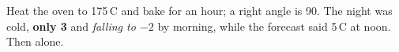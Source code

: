 \documentclass{article}
\begin{document}
Heat the oven to 175\,\textdegree C and bake for an hour; a right angle is 90\textdegree.
The night was cold, \textbf{only 3\textdegree} and \textit{falling to $-2$\textdegree} by morning,
while {\small the forecast said 5\,\textdegree C} at noon. Then \textdegree{} alone.
\end{document}
